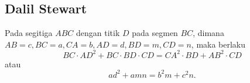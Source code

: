\subsection{Dalil Stewart}
    Pada segitiga $ABC$ dengan titik $D$ pada segmen $BC$, dimana $AB=c, BC=a, CA=b, AD=d, BD=m, CD=n$, maka berlaku
    $$BC \cdot AD^2 + BC \cdot BD \cdot CD = CA^2 \cdot BD + AB^2 \cdot CD$$
    atau $$ad^2+amn = b^2m+c^2n.$$

